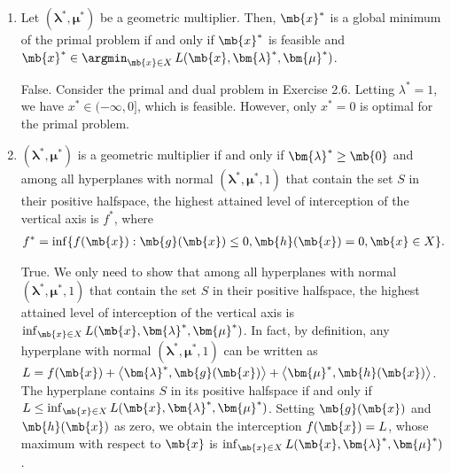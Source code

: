 \begin{exercise}
\begin{enumerate}
        \item 	Let $(\bm{\lambda}^*,\bm{\mu}^*)$ be a geometric multiplier. Then, $\mb{x}^*$ is a global minimum of the primal problem if and only if $\mb{x}^*$ is feasible and $\mb{x}^*\in\argmin_{\mb{x}\in X}\,L(\mb{x},\bm{\lambda}^*,\bm{\mu}^*)$.

            \begin{solution}
                False. Consider the primal and dual problem in Exercise 2.6. Letting $\lambda^* = 1$, we have $x^* \in (-\infty, 0]$, which is feasible. However, only $x^* = 0$ is optimal for the primal problem.
                \qedhere
            \end{solution}


        \item  $(\bm{\lambda}^*,\bm{\mu}^*)$ is a geometric multiplier if and only if $\bm{\lambda}^*\geq\mb{0}$ and among all hyperplanes with normal $(\bm{\lambda}^*,\bm{\mu}^*,1)$ that contain the set $S$ in their positive halfspace, the highest attained level of interception of the vertical axis is $f^*$, where
            \begin{align*}
                f^*=\inf\{f(\mb{x}):\mb{g}(\mb{x})\leq0,\mb{h}(\mb{x})=0,\mb{x}\in X\}.
            \end{align*}

            \begin{solution}
                True. We only need to show that among all hyperplanes with normal $(\bm{\lambda}^*,\bm{\mu}^*,1)$ that contain the set $S$ in their positive halfspace, the highest attained level of interception of the vertical axis is $\inf_{\mb{x}\in X} L(\mb{x}, \bm{\lambda}^*, \bm{\mu}^*)$. In fact, by definition, any hyperplane with normal $(\bm{\lambda}^*,\bm{\mu}^*,1)$ can be written as $L = f(\mb{x}) + \left\langle\bm{\lambda}^*, \mb{g}(\mb{x})\right\rangle + \left\langle\bm{\mu}^*, \mb{h}(\mb{x})\right\rangle$. The hyperplane contains $S$ in its positive halfspace if and only if $L \le \inf_{\mb{x}\in X} L(\mb{x}, \bm{\lambda}^*, \bm{\mu}^*)$. Setting $\mb{g}(\mb{x})$ and $\mb{h}(\mb{x})$ as zero, we obtain the interception $f(\mb{x}) = L$, whose maximum with respect to $\mb{x}$ is $\inf_{\mb{x}\in X} L(\mb{x}, \bm{\lambda}^*, \bm{\mu}^*)$.
                \qedhere
            \end{solution}

    \end{enumerate}
\end{exercise}
\clearpage




